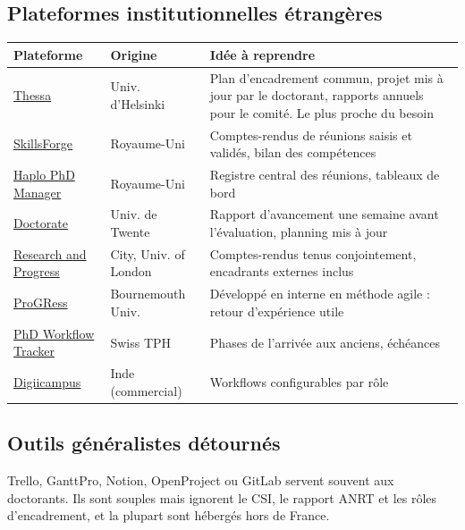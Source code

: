 \documentclass[11pt,a4paper]{article}
\begin{document}
\subsection{Plateformes institutionnelles étrangères}
\begin{center}\small
\begin{tabularx}{\linewidth}{P{3.4cm} P{3.2cm} L}
\toprule
\textbf{Plateforme} & \textbf{Origine} & \textbf{Idée à reprendre}\\
\midrule
\href{https://studies.helsinki.fi/instructions/article/thessa}{Thessa} & Univ. d'Helsinki & Plan d'encadrement commun, projet mis à jour par le doctorant, rapports annuels pour le comité. Le plus proche du besoin\\
\href{https://skillsforge.net}{SkillsForge} & Royaume-Uni & Comptes-rendus de réunions saisis et validés, bilan des compétences\\
\href{https://www.haplo.com/phd-manager}{Haplo PhD Manager} & Royaume-Uni & Registre central des réunions, tableaux de bord\\
\href{https://www.utwente.nl/en/service-portal/research-support/phd-engd-programmes-tgs/doctorate-phdengd-monitoring-system}{Doctorate} & Univ. de Twente & Rapport d'avancement une semaine avant l'évaluation, planning mis à jour\\
\href{https://studenthub.city.ac.uk/help-and-support/doctoral-college/research-and-progress}{Research and Progress} & City, Univ. of London & Comptes-rendus tenus conjointement, encadrants externes inclus\\
\href{https://hsd.ardascience.com/index.php/journal/article/download/1623/264/5253}{ProGRess} & Bournemouth Univ. & Développé en interne en méthode agile : retour d'expérience utile\\
\href{https://phdquest.swisstph.ch/}{PhD Workflow Tracker} & Swiss TPH & Phases de l'arrivée aux anciens, échéances\\
\href{https://digiicampus.com/phd-management/}{Digiicampus} & Inde (commercial) & Workflows configurables par rôle\\
\bottomrule
\end{tabularx}
\end{center}

\subsection{Outils généralistes détournés}
Trello, GanttPro, Notion, OpenProject ou GitLab servent souvent aux doctorants. Ils
sont souples mais ignorent le CSI, le rapport ANRT et les rôles d'encadrement, et la
plupart sont hébergés hors de France.
\end{document}

